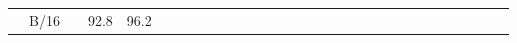 \begin{table*}[]
\begin{tabular}{cc|cccccccccccccccccccccccccccc}
        \\
        &B/16& \hspace{-1.2em} & \hspace{-0.9em}92.8\hspace{-0.4em} & \hspace{-0.9em}96.2\hspace{-0
\end{tabular}
\end{table*}

